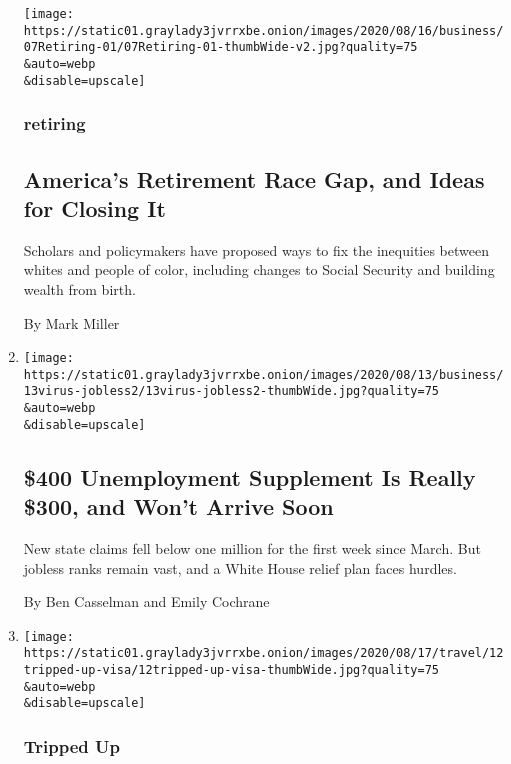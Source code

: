 \begin{enumerate}
  \texttt{[image: https://static01.graylady3jvrrxbe.onion/images/2020/08/16/business/07Retiring-01/07Retiring-01-thumbWide-v2.jpg?quality=75\\\&auto=webp\\\&disable=upscale]}

  \hypertarget{retiring}{%
  \subsubsection{retiring}\label{retiring}}

  \hypertarget{americas-retirement-race-gap-and-ideas-for-closing-it}{%
  \subsection{America's Retirement Race Gap, and Ideas for Closing
  It}\label{americas-retirement-race-gap-and-ideas-for-closing-it}}

  Scholars and policymakers have proposed ways to fix the inequities
  between whites and people of color, including changes to Social
  Security and building wealth from birth.

  By Mark Miller
\item
  \href{/2020/08/13/business/economy/unemployment-benefits-coronavirus.html}{}

  \texttt{[image: https://static01.graylady3jvrrxbe.onion/images/2020/08/13/business/13virus-jobless2/13virus-jobless2-thumbWide.jpg?quality=75\\\&auto=webp\\\&disable=upscale]}

  \hypertarget{400-unemployment-supplement-is-really-300-and-wont-arrive-soon}{%
  \subsection{\$400 Unemployment Supplement Is Really \$300, and Won't
  Arrive
  Soon}\label{400-unemployment-supplement-is-really-300-and-wont-arrive-soon}}

  New state claims fell below one million for the first week since
  March. But jobless ranks remain vast, and a White House relief plan
  faces hurdles.

  By Ben Casselman and Emily Cochrane
\item
  \href{/2020/08/12/travel/virus-visa-extensions.html}{}

  \texttt{[image: https://static01.graylady3jvrrxbe.onion/images/2020/08/17/travel/12tripped-up-visa/12tripped-up-visa-thumbWide.jpg?quality=75\\\&auto=webp\\\&disable=upscale]}

  \hypertarget{tripped-up}{%
  \subsubsection{Tripped Up}\label{tripped-up}}


\end{enumerate}
